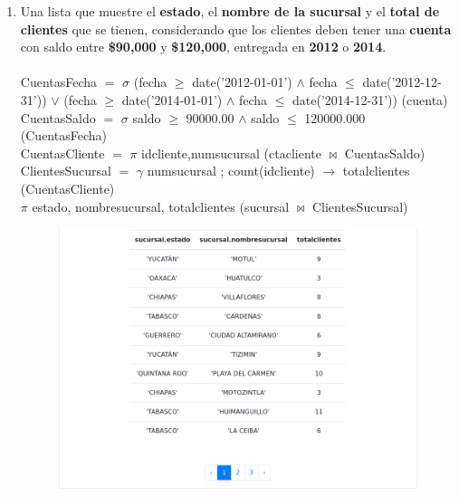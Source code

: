 \documentclass{exam}
\begin{document}
\begin{questions}
\begin{enumerate}[label=\alph*.]
		
		\newpage
		\item Una lista que muestre el \textbf{estado}, el \textbf{nombre de la sucursal} y el \textbf{total de clientes} que se tienen, considerando que los clientes deben tener una \textbf{cuenta} con saldo entre \textbf{\$90,000} y \textbf{\$120,000}, entregada en \textbf{2012} o \textbf{2014}.\\\\
		CuentasFecha $=$ $\sigma$ (fecha $\geqslant$ date('2012-01-01') $\wedge$ fecha $\leqslant$ date('2012-12-31')) $\vee$ (fecha $\geqslant$ date('2014-01-01') $\wedge$ fecha $\leqslant$ date('2014-12-31')) (cuenta)\\
		CuentasSaldo $=$ $\sigma$ saldo $\geqslant$ 90000.00 $\wedge$ saldo $\leqslant$ 120000.000 (CuentasFecha)\\
		CuentasCliente $=$ $\pi$ idcliente,numsucursal (ctacliente $\bowtie$ CuentasSaldo)\\
		ClientesSucursal $=$ $\gamma$ numsucursal ; count(idcliente) $\longrightarrow$ totalclientes (CuentasCliente)\\
		$\pi$ estado, nombresucursal, totalclientes (sucursal $\bowtie$ ClientesSucursal)\\
		\begin{center}
		\begin{figure}[h!]
			\includegraphics[width=17cm]{imgs/2f.png}
			\centering
		\end{figure}	
		\end{center}
		

\end{enumerate}
\end{questions}
\end{document}
